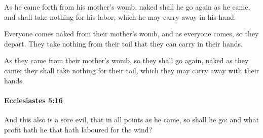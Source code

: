 			\begin{versebox}
					\item[BHS] 
					\item[LXX] 
					\item[ASV] As he came forth from his mother's womb, naked shall he go again as he came, and shall take nothing for his labor, which he may carry away in his hand.
					\item[NIV] Everyone comes naked from their mother’s womb, and as everyone comes, so they depart. They take nothing from their toil that they can carry in their hands.
					\item[NRSV] As they came from their mother’s womb, so they shall go again, naked as they came; they shall take nothing for their toil, which they may carry away with their hands.
			\end{versebox}

		\paragraph{Ecclesiastes 5:16} %
			\label{ECCLESIASTES-5-16}

			And this also is a sore evil, that in all points as he came, so shall he go: and what profit hath he that hath laboured for the wind?

